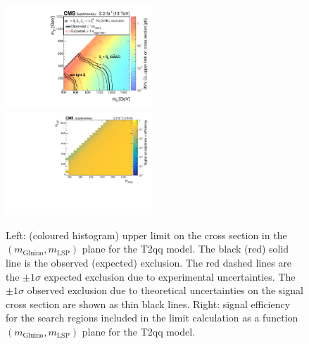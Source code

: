 \clearpage
\begin{figure}[t]
  \begin{center}
    \includegraphics[width=0.49\textwidth]{RA1T2qqXSEC_aux} \, 
    \includegraphics[width=0.49\textwidth]{T2qq_merging_4_cats_aux} \,     
  \end{center}
  \caption{Left: (coloured histogram) upper limit on the cross section in the $(m_{\mathrm{Gluino}},m_{\mathrm{LSP}})$ plane for the T2qq model. 
  The black (red) solid line is the observed (expected) exclusion. The red dashed lines are the $\pm1\sigma$ expected exclusion due to experimental uncertainties. 
  The $\pm1\sigma$ observed exclusion due to theoretical uncertainties on the signal cross section are shown as thin black lines. 
  Right: signal efficiency for the search regions included in the limit calculation as a function $(m_{\mathrm{Gluino}},m_{\mathrm{LSP}})$ plane for the T2qq model. 
  \label{fig:T2qq_excl}}
\end{figure}




